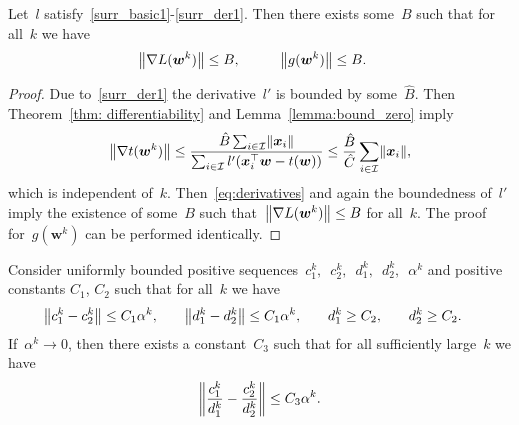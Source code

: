 \begin{lemma}\label{lemma:bound_g}
  Let~$l$ satisfy~\ref{surr_basic1}-\ref{surr_der1}. Then there exists some~$B$ such that for all~$k$ we have
  \begin{equation*}
    \begin{aligned}
      \norm{\nabla L(\bm{w}^k)} & \leq B, \quad & \quad
      \norm{g(\bm{w}^k)} & \leq B.
    \end{aligned}
  \end{equation*}
\end{lemma}
\begin{proof}
  Due to~\ref{surr_der1} the derivative~$l'$ is bounded by some~$\hat{B}$. Then Theorem~\ref{thm: differentiability} and Lemma~\ref{lemma:bound_zero} imply
  \begin{equation*}
    \norm{\nabla t(\bm{w}^k)}
      \leq \frac{\hat{B} \sum_{i \in \I} \norm{\bm{x}_i}}{\sum_{i \in \I} l'(\bm{x}_i^\top \bm{w} - t(\bm{w}))}
      \leq \frac{\hat{B}}{\hat{C}} \sum_{i\in \I} \norm{\bm{x}_i},
  \end{equation*}
  which is independent of~$k$. Then~\eqref{eq:derivatives} and again the boundedness of~$l'$ imply the existence of some~$B$ such that~$\norm{\nabla L(\bm{w}^k)} \leq B$ for all~$k$. The proof for~$g(\bm{w}^k)$ can be performed identically.
\end{proof}

\begin{lemma}\label{lemma:ratio}
  Consider uniformly bounded positive sequences~$c_1^k,$~$c_2^k,$~$d_1^k,$~$d_2^k,$~$\alpha^k$ and positive constants $C_1$, $C_2$ such that for all~$k$ we have
  \begin{equation*}
    \begin{aligned}
      \norm{c_1^k-c_2^k} & \leq C_1\alpha^k, \quad &
      \norm{d_1^k-d_2^k} & \leq C_1\alpha^k, \quad &
      d_1^k & \geq C_2, \quad &
      d_2^k & \geq C_2.
    \end{aligned}
  \end{equation*}
  If~$\alpha^k \to 0$, then there exists a constant~$C_3$ such that for all sufficiently large~$k$ we have
  \begin{equation*}
    \norm{\frac{c_1^k}{d_1^k} - \frac{c_2^k}{d_2^k}} \leq C_3\alpha^k.
  \end{equation*}
\end{lemma}

